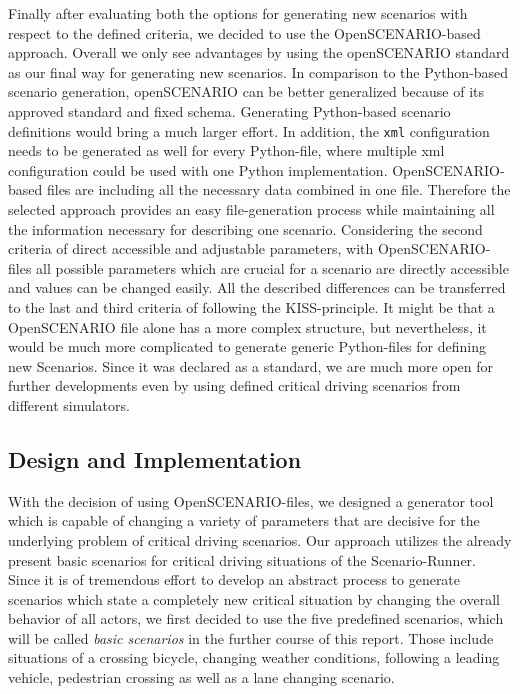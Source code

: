 \documentclass[conference, a4paper, 11pt]{IEEEtran}
\begin{document}
Finally after evaluating both the options for generating new scenarios with respect to the defined criteria, we decided to use the OpenSCENARIO-based approach. Overall we only see advantages by using the openSCENARIO standard as our final way for generating new scenarios. In comparison to the Python-based scenario generation, openSCENARIO can be better generalized because of its approved standard and fixed schema. Generating Python-based scenario definitions would bring a much larger effort. In addition, the \texttt{xml} configuration needs to be generated as well for every Python-file, where multiple xml configuration could be used with one Python implementation. OpenSCENARIO-based files are including all the necessary data combined in one file. Therefore the selected approach provides an easy file-generation process while maintaining all the information necessary for describing one scenario. Considering the second criteria of direct accessible and adjustable parameters, with OpenSCENARIO-files all possible parameters which are crucial for a scenario are directly accessible and values can be changed easily.
All the described differences can be transferred to the last and third criteria of following the KISS-principle. It might be that a OpenSCENARIO file alone has a more complex structure, but nevertheless, it would be much more complicated to generate generic Python-files for defining new Scenarios. Since it was declared as a standard, we are much more open for further developments even by using defined critical driving scenarios from different simulators.

\subsection{Design and Implementation}
With the decision of using OpenSCENARIO-files, we designed a generator tool which is capable of changing a variety of parameters that are decisive for the underlying problem of critical driving scenarios. Our approach utilizes the already present basic scenarios for critical driving situations of the Scenario-Runner. Since it is of tremendous effort to develop an abstract process to generate scenarios which state a completely new critical situation by changing the overall behavior of all actors, we first decided to use the five predefined scenarios, which will be called \textit{basic scenarios} in the further course of this report. Those include situations of a crossing bicycle,  changing weather conditions, following a leading vehicle, pedestrian crossing as well as a lane changing scenario.
\end{document}
